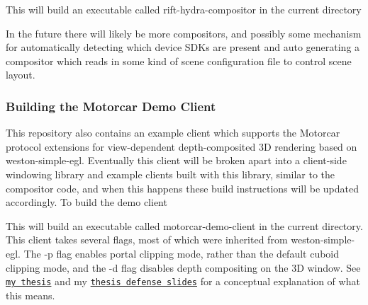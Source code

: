 This will build an executable called rift-\/hydra-\/compositor in the current directory

In the future there will likely be more compositors, and possibly some mechanism for automatically detecting which device S\-D\-Ks are present and auto generating a compositor which reads in some kind of scene configuration file to control scene layout.

\subsubsection*{Building the Motorcar Demo Client}

This repository also contains an example client which supports the Motorcar protocol extensions for view-\/dependent depth-\/composited 3\-D rendering based on weston-\/simple-\/egl. Eventually this client will be broken apart into a client-\/side windowing library and example clients built with this library, similar to the compositor code, and when this happens these build instructions will be updated accordingly. To build the demo client 


This will build an executable called motorcar-\/demo-\/client in the current directory. This client takes several flags, most of which were inherited from weston-\/simple-\/egl. The -\/p flag enables portal clipping mode, rather than the default cuboid clipping mode, and the -\/d flag disables depth compositing on the 3\-D window. See \href{https://github.com/evil0sheep/MastersThesis/blob/master/thesis.pdf?raw=true}{\tt my thesis} and my \href{https://docs.google.com/presentation/d/1svgGMxxbfmcHy_KuS5Q9hah8PQOsXqvjBKOoMIzW24Y/edit?usp=sharing}{\tt thesis defense slides} for a conceptual explanation of what this means. 